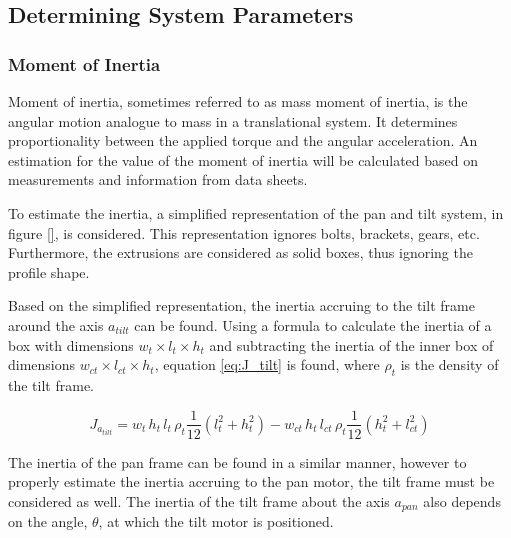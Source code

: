 \documentclass[../../main.tex]{subfiles}
\begin{document}
\subsection{Determining System Parameters}\label{subsec:motorParameters}
\subsubsection*{Moment of Inertia}
Moment of inertia, sometimes referred to as mass moment of inertia, is the angular motion analogue to mass in a translational system. It determines proportionality between the applied torque and the angular acceleration. An estimation for the value of the moment of inertia will be calculated based on measurements and information from data sheets. 

To estimate the inertia, a simplified representation of the pan and tilt system, in figure \ref{}, is considered. This representation ignores bolts, brackets, gears, etc. Furthermore, the extrusions are considered as solid boxes, thus ignoring the profile shape.

Based on the simplified representation, the inertia accruing to the tilt frame around the axis $a_{tilt}$ can be found. Using a formula to calculate the inertia of a box with dimensions $w_t\times l_t\times h_t$ and subtracting the inertia of the inner box of dimensions $w_{ct}\times l_{ct}\times h_t$, equation \ref{eq:J_tilt} is found, where $\rho_t$ is the density of the tilt frame.

\begin{equation} \label{eq:J_tilt}
    J_{a_{tilt}} =  w_{t} \,h_{t}\, l_{t}\,\rho_{t}\frac{1}{12}(l_{t}^2+h_{t}^2)-w_{ct}\, h_{t} \, l_{ct} \, \rho_{t}\frac{1}{12}(h_{t}^2+l_{ct}^2)
\end{equation}

The inertia of the pan frame can be found in a similar manner, however to properly estimate the inertia accruing to the pan motor, the tilt frame must be considered as well. The inertia of the tilt frame about the axis $a_{pan}$ also depends on the angle, $\theta$, at which the tilt motor is positioned.
\end{document}
